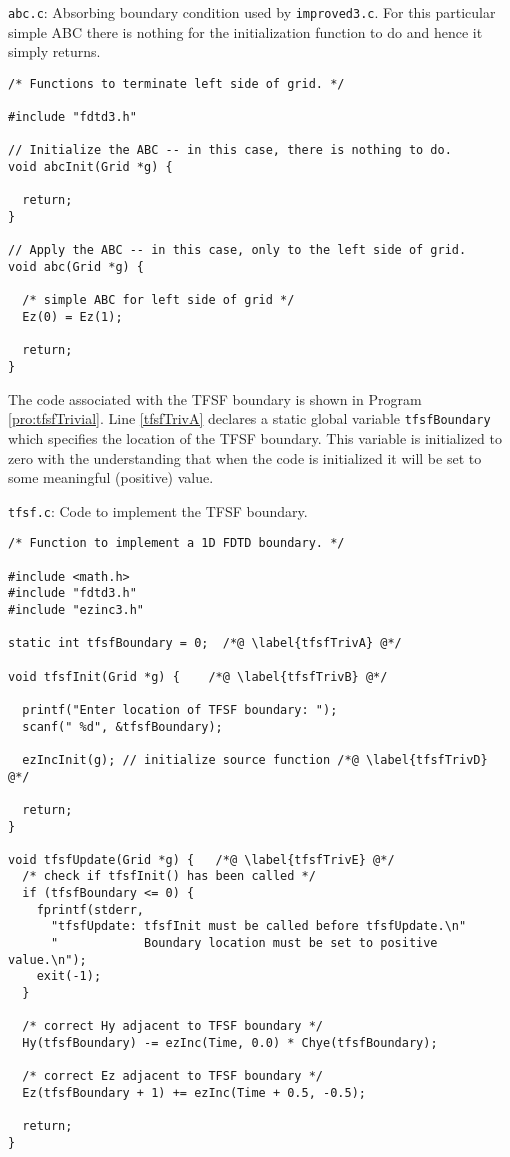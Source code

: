 \begin{program}
{\tt abc.c}: Absorbing boundary condition used by {\tt improved3.c}.
For this particular simple ABC there is nothing for the initialization
function to do and hence it simply returns.
\label{pro:abcTrivial}
\codemiddle
\begin{lstlisting}
/* Functions to terminate left side of grid. */

#include "fdtd3.h"

// Initialize the ABC -- in this case, there is nothing to do.
void abcInit(Grid *g) {

  return;
}

// Apply the ABC -- in this case, only to the left side of grid.
void abc(Grid *g) {

  /* simple ABC for left side of grid */
  Ez(0) = Ez(1);

  return;
}
\end{lstlisting}
\end{program}

The code associated with the TFSF boundary is shown in Program
\ref{pro:tfsfTrivial}.  Line \ref{tfsfTrivA} declares a static global
variable {\tt tfsfBoundary} which specifies the location of the TFSF
boundary.  This variable is initialized to zero with the understanding
that when the code is initialized it will be set to some meaningful
(positive) value.

\begin{program}
{\tt tfsf.c}: Code to implement the TFSF boundary.
\label{pro:tfsfTrivial}
\codemiddle
\begin{lstlisting}
/* Function to implement a 1D FDTD boundary. */

#include <math.h>
#include "fdtd3.h"
#include "ezinc3.h"

static int tfsfBoundary = 0;  /*@ \label{tfsfTrivA} @*/

void tfsfInit(Grid *g) {    /*@ \label{tfsfTrivB} @*/

  printf("Enter location of TFSF boundary: ");
  scanf(" %d", &tfsfBoundary);

  ezIncInit(g); // initialize source function /*@ \label{tfsfTrivD} @*/

  return;
}

void tfsfUpdate(Grid *g) {   /*@ \label{tfsfTrivE} @*/
  /* check if tfsfInit() has been called */
  if (tfsfBoundary <= 0) {
    fprintf(stderr,
      "tfsfUpdate: tfsfInit must be called before tfsfUpdate.\n"
      "            Boundary location must be set to positive value.\n");
    exit(-1);
  }

  /* correct Hy adjacent to TFSF boundary */
  Hy(tfsfBoundary) -= ezInc(Time, 0.0) * Chye(tfsfBoundary);
    
  /* correct Ez adjacent to TFSF boundary */
  Ez(tfsfBoundary + 1) += ezInc(Time + 0.5, -0.5);
  
  return;
}
\end{lstlisting}
\end{program}

